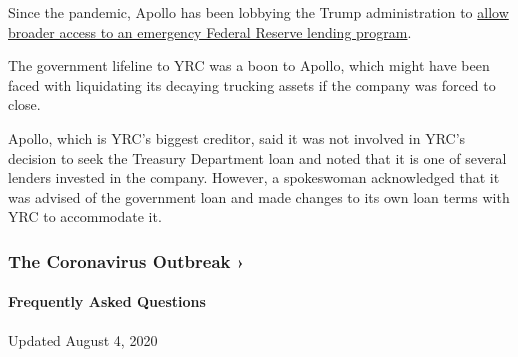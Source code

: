 Since the pandemic, Apollo has been lobbying the Trump administration to
\href{https://www.nytimes3xbfgragh.onion/2020/04/04/business/economy/apollo-federal-reserve-lending-talf.html}{allow
broader access to an emergency Federal Reserve lending program}.

The government lifeline to YRC was a boon to Apollo, which might have
been faced with liquidating its decaying trucking assets if the company
was forced to close.

Apollo, which is YRC's biggest creditor, said it was not involved in
YRC's decision to seek the Treasury Department loan and noted that it is
one of several lenders invested in the company. However, a spokeswoman
acknowledged that it was advised of the government loan and made changes
to its own loan terms with YRC to accommodate it.

\href{https://www.nytimes3xbfgragh.onion/news-event/coronavirus?action=click\&pgtype=Article\&state=default\&region=MAIN_CONTENT_3\&context=storylines_faq}{}

\hypertarget{the-coronavirus-outbreak-}{%
\subsubsection{The Coronavirus Outbreak
›}\label{the-coronavirus-outbreak-}}

\hypertarget{frequently-asked-questions}{%
\paragraph{Frequently Asked
Questions}\label{frequently-asked-questions}}

Updated August 4, 2020


